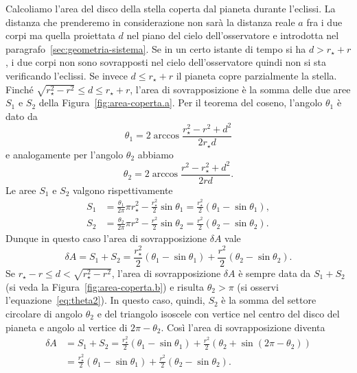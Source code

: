 Calcoliamo l'area del disco della stella coperta dal pianeta durante
l'eclissi. La distanza che prenderemo in considerazione non sarà la distanza
reale $a$ fra i due corpi ma quella proiettata $d$ nel piano del cielo
dell'osservatore e introdotta nel paragrafo~\ref{sec:geometria-sistema}. Se in
un certo istante di tempo si ha $d > r_\star + r$, i due corpi non sono
sovrapposti nel cielo dell'osservatore quindi non si sta verificando
l'eclissi. Se invece $d \leq r_\star + r$ il pianeta copre parzialmente la
stella. Finché $\sqrt{r_\star^2 - r^2} \leq d \leq r_\star + r$, l'area di
sovrapposizione è la somma delle due aree $S_1$ e $S_2$ della
Figura~\ref{fig:area-coperta.a}. Per il teorema del coseno, l'angolo $\theta_1$
è dato da
\begin{equation}
  \theta_1 = 2 \arccos \frac{r_\star^2 - r^2 + d^2}{2r_\star d}
\end{equation}
e analogamente per l'angolo $\theta_2$ abbiamo
\begin{equation}
  \label{eq:theta2}
  \theta_2 = 2 \arccos \frac{r^2 - r_\star^2 + d^2}{2rd}.
\end{equation}
Le aree $S_1$ e $S_2$ valgono rispettivamente
\begin{subequations}
  \begin{align}
    S_1 &= \frac{\theta_1}{2\pi}\pi r_\star^2 - \frac{r_\star^2}{2}\sin\theta_1
    = \frac{r_\star^2}{2}(\theta_1 - \sin\theta_1), \\
    S_2 &= \frac{\theta_2}{2\pi}\pi r^2 - \frac{r^2}{2}\sin\theta_2 =
    \frac{r^2}{2}(\theta_2 - \sin\theta_2).
  \end{align}
\end{subequations}
Dunque in questo caso l'area di sovrapposizione $\delta A$ vale
\begin{equation}
  \delta A = S_1 + S_2 = \frac{r_\star^2}{2}(\theta_1 - \sin\theta_1) +
  \frac{r^2}{2}(\theta_2 - \sin\theta_2).
\end{equation}
Se $r_\star - r \leq d < \sqrt{r_\star^2 - r^2}$, l'area di sovrapposizione
$\delta A$ è sempre data da $S_1 + S_2$ (si veda la
Figura~\ref{fig:area-coperta.b}) e risulta $\theta_2 > \pi$ (si osservi
l'equazione~\ref{eq:theta2}). In questo caso, quindi, $S_2$ è la somma del
settore circolare di angolo $\theta_2$ e del triangolo isoscele con vertice nel
centro del disco del pianeta e angolo al vertice di $2\pi - \theta_2$. Così
l'area di sovrapposizione diventa
\begin{equation}
  \begin{split}
    \delta A &= S_1 + S_2 = \frac{r_\star^2}{2}(\theta_1 - \sin\theta_1) +
    \frac{r^2}{2}(\theta_2 + \sin(2\pi -\theta_2)) \\
    &= \frac{r_\star^2}{2}(\theta_1 - \sin\theta_1) + \frac{r^2}{2}(\theta_2 -
    \sin\theta_2).
  \end{split}
\end{equation}
